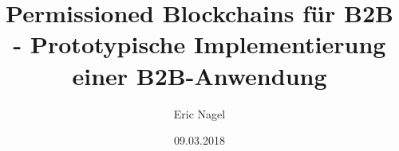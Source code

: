 \documentclass[a4paper,12pt,headsepline]{report}
\title{Permissioned Blockchains für B2B - Prototypische Implementierung einer B2B-Anwendung}
\author{Eric Nagel}
\date{09.03.2018}
\begin{document}

 

 

 

 
 
\tableofcontents %

\listoffigures %

\listoftables %

\renewcommand{\lstlistlistingname}{Listingverzeichnis}
\lstlistoflistings

\pagestyle{plain} %


	









			
\end{document}

